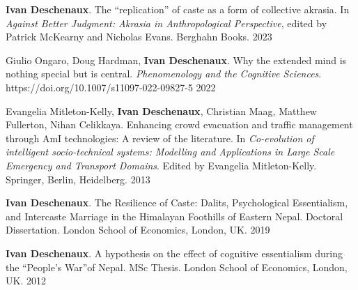 \begin{cvpublications}

  \cvpublication
  {\textbf{Ivan Deschenaux}. The ``replication'' of caste as a form of collective akrasia. In \textit{Against Better Judgment: Akrasia in Anthropological Perspective}, edited by Patrick McKearny and Nicholas Evans. Berghahn Books.} %
    {2023} %


  \cvpublication
  {Giulio Ongaro, Doug Hardman, \textbf{Ivan Deschenaux}. Why the extended mind is nothing special but is central. \textit{Phenomenology and the Cognitive Sciences}. https://doi.org/10.1007/s11097-022-09827-5} %
    {2022} %

  \cvpublication
  {Evangelia Mitleton-Kelly, \textbf{Ivan Deschenaux}, Christian Maag, Matthew Fullerton, Nihan Celikkaya. Enhancing crowd evacuation and traffic management through AmI technologies: A review of the literature. In \textit{Co-evolution of intelligent socio-technical systems: Modelling and Applications in Large Scale Emergency and Transport Domains}. Edited by Evangelia Mitleton-Kelly. Springer, Berlin, Heidelberg.} %
    {2013} %


\end{cvpublications}



\begin{cvpublications}

  \cvpublication
  {\textbf{Ivan Deschenaux}. The Resilience of Caste: Dalits, Psychological Essentialism, and Intercaste Marriage in the Himalayan Foothills of Eastern Nepal. Doctoral Dissertation. London School of Economics, London, UK.} %
    {2019} %

  \cvpublication
  {\textbf{Ivan Deschenaux}. A hypothesis on the effect of cognitive essentialism during the ``People's War''of Nepal. MSc Thesis. London School of Economics, London, UK.} %
    {2012} %

\end{cvpublications}
